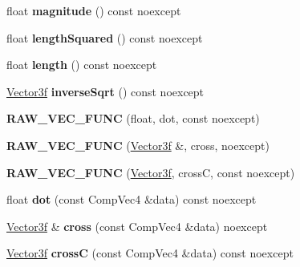 \begin{DoxyCompactItemize}
\item 
\mbox{\label{class_vector3f_a9921b92d7fd31fc28bab947d061d1533}} 
float {\bfseries magnitude} () const noexcept
\item 
\mbox{\label{class_vector3f_a774748eb74ea927b36b214737467264e}} 
float {\bfseries length\+Squared} () const noexcept
\item 
\mbox{\label{class_vector3f_ab5ceb51ef9e48bb3776ed179e9f729b6}} 
float {\bfseries length} () const noexcept
\item 
\mbox{\label{class_vector3f_a4fa576a7824df90857e83304587afddd}} 
\mbox{\hyperlink{class_vector3f}{Vector3f}} {\bfseries inverse\+Sqrt} () const noexcept
\item 
\mbox{\label{class_vector3f_a9b0acc9cad15a49af56c3fc5c3d09965}} 
{\bfseries R\+A\+W\+\_\+\+V\+E\+C\+\_\+\+F\+U\+NC} (float, dot, const noexcept)
\item 
\mbox{\label{class_vector3f_a292e6718be5165a86cb0f05790f4ab06}} 
{\bfseries R\+A\+W\+\_\+\+V\+E\+C\+\_\+\+F\+U\+NC} (\mbox{\hyperlink{class_vector3f}{Vector3f}} \&, cross, noexcept)
\item 
\mbox{\label{class_vector3f_a2bcae3d4c31bebe30fe808611ed469f2}} 
{\bfseries R\+A\+W\+\_\+\+V\+E\+C\+\_\+\+F\+U\+NC} (\mbox{\hyperlink{class_vector3f}{Vector3f}}, crossC, const noexcept)
\item 
\mbox{\label{class_vector3f_af722aedce600ad149642c1c822104f28}} 
float {\bfseries dot} (const Comp\+Vec4 \&data) const noexcept
\item 
\mbox{\label{class_vector3f_a21c67c09d5a27cc588d464a2fdb2c1a8}} 
\mbox{\hyperlink{class_vector3f}{Vector3f}} \& {\bfseries cross} (const Comp\+Vec4 \&data) noexcept
\item 
\mbox{\label{class_vector3f_aaa1c2e4c5c67b67e31ec30830811dcda}} 
\mbox{\hyperlink{class_vector3f}{Vector3f}} {\bfseries crossC} (const Comp\+Vec4 \&data) const noexcept
\item 

\end{DoxyCompactItemize}
